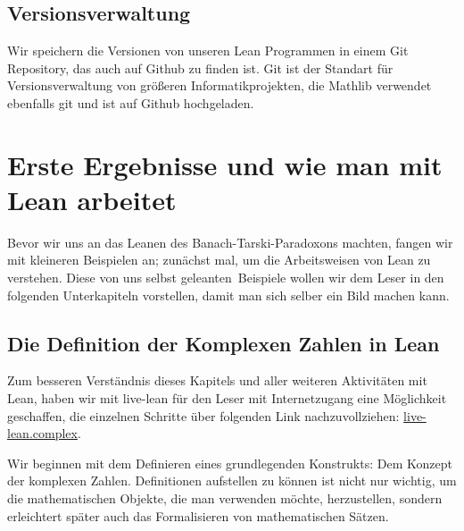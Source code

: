 \documentclass[10pt]{article}
\begin{document}
\subsection{Versionsverwaltung}
Wir speichern die Versionen von unseren Lean Programmen in einem Git Repository, das auch auf Github zu finden ist. Git ist der Standart für Versionsverwaltung von größeren Informatikprojekten, die Mathlib verwendet ebenfalls git und ist auf Github hochgeladen.

\section{Erste Ergebnisse und wie man mit Lean arbeitet}
Bevor wir uns an das Leanen des Banach-Tarski-Paradoxons machten, fangen wir mit kleineren Beispielen an; zunächst mal, um die Arbeitsweisen von Lean zu verstehen. Diese von uns selbst \glqq geleanten\grqq~Beispiele wollen wir dem Leser in den folgenden Unterkapiteln vorstellen, damit man sich selber ein Bild machen kann.  

\subsection{Die Definition der Komplexen Zahlen in Lean}
Zum besseren Verständnis dieses Kapitels und aller weiteren Aktivitäten mit Lean, haben wir mit live-lean für den Leser mit Internetzugang eine Möglichkeit geschaffen, die einzelnen Schritte über folgenden Link nachzuvollziehen: \href{https://live.lean-lang.org/#code=import%20Mathlib.Data.Real.Basic%0Aimport%20Mathlib.Data.Real.Sign%0A%0Astructure%20CC_complex%20where%0A%20%20re%20%3A%20Real%0A%20%20im%20%3A%20Real%0A%0Ainstance%20%3A%20Zero%20CC_complex%20%3A%3D%0A%20%20%20%20%E2%9F%A8%E2%9F%A80%2C0%E2%9F%A9%E2%9F%A9%0A%0Ainstance%20%3A%20One%20CC_complex%20%3A%3D%0A%20%20%20%20%E2%9F%A8%E2%9F%A81%2C1%E2%9F%A9%E2%9F%A9%0A%0A%0Ainstance%20%3A%20Add%20CC_complex%20%3A%3D%0A%20%20%E2%9F%A8%20fun%20x%20y%20%20%E2%86%A6%20%20%E2%9F%A8%20x.re%20%2B%20y.re%2C%20x.im%20%2B%20y.im%20%E2%9F%A9%20%E2%9F%A9%0A%0Ainstance%20%3A%20Neg%20CC_complex%20%3A%3D%0A%20%20%E2%9F%A8%20fun%20x%20%E2%86%A6%20%E2%9F%A8%20-x.re%2C%20-x.im%E2%9F%A9%20%E2%9F%A9%0A%0Ainstance%20%3A%20Mul%20CC_complex%20%3A%3D%0A%20%20%E2%9F%A8%20fun%20x%20y%20%20%E2%86%A6%20%20%E2%9F%A8%20x.re%20*%20y.re%20-%20x.im%20*%20y.im%2C%20x.re%20*%20y.im%20%2B%20x.im%20*%20y.re%E2%9F%A9%E2%9F%A9%0A%0Anoncomputable%20instance%20%3A%20Inv%20CC_complex%20%3A%3D%0A%20%20%E2%9F%A8%20fun%20x%20%20%E2%86%A6%20%20%E2%9F%A8%20x.re%20%2F%20(x.re%5E2%2Bx.im%5E2)%2C%20-x.im%20%2F%20(x.re%5E2%2Bx.im%5E2)%E2%9F%A9%E2%9F%A9%0A}{live-lean.complex}.\par 
\vspace{0.2cm}
\noindent Wir beginnen mit dem Definieren eines grundlegenden Konstrukts: Dem Konzept der komplexen Zahlen. Definitionen aufstellen zu können ist nicht nur wichtig, um die mathematischen Objekte, die man verwenden möchte, herzustellen, sondern erleichtert später auch das Formalisieren von mathematischen Sätzen.
\end{document}
